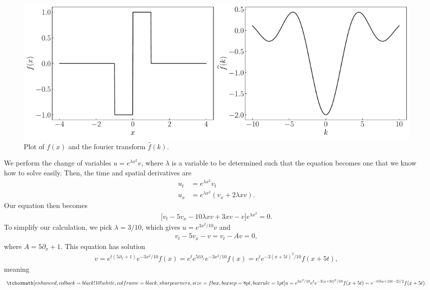 \begin{figure}[H]
\begin{center}
    \includegraphics[width=\textwidth]{prob6.pdf} 
\end{center} 
\caption{
    Plot of $f(x)$ and the fourier transform $\widehat{f}(k)$.
}
\end{figure}



We perform the change of variables $u = e^{\lambda x^2} v$, where $\lambda$ is a variable to be determined such that the equation becomes one that we know how to solve easily.
Then, the time and spatial derivatives are
\begin{align}
    \label{eq:change-vars}
    u_{t} &= e^{\lambda x^2} v_{t} \\
    u_{x} &= e^{\lambda x^2}( v_{x} + 2 \lambda x v)
.\end{align}
Our equation then becomes
\begin{eqnarray}
    \label{eq:change-vars-eq}
    \big[ v_{t} - 5v_{x} - 10 \lambda x v + 3xv - v \big] e^{\lambda x^2} = 0
.\end{eqnarray}
To simplify our calculation, we pick $\lambda = 3/10$, which gives $u = e^{3x^2/10}v$ and
\begin{eqnarray}
    \label{eq:change-vars-eq-2}
    v_{t} - 5v_{x} - v = v_{t} - Av = 0
,\end{eqnarray}
where $A = 5\partial_{x} + 1$.
This equation has solution
\begin{eqnarray}
    \label{eq:v-sol}
    v = e^{t(5 \partial_{x} + 1)}e^{-3x^2/10}f(x) = e^{t} e^{5t\partial_{x}}e^{-3x^2/10}f(x) = e^{t}e^{-3(x+5t)^2/10}f(x+5t)
,\end{eqnarray}
meaning
\begin{eqnarray}
    \label{eq:u-sol}
    \eqbox{
    u = e^{3x^2/10}e^{t}e^{-3(x+5t)^2/10}f(x+5t) = e^{-t(6x+15t-2)/2}f(x+5t)
}
.\end{eqnarray}








